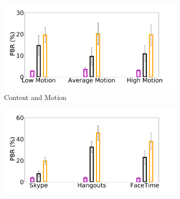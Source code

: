 \begin{figure}
    \begin{subfigure}[b]{0.33\textwidth}
        \centering
        \includegraphics[width=1\linewidth]{sections/network-work/content-bitrate}
        \caption{Content and Motion}
    \end{subfigure}
    \begin{subfigure}[b]{0.33\textwidth}
        \centering
        \includegraphics[width=1\linewidth]{sections/network-work/app-bitrate}

\end{subfigure}
\end{figure}
